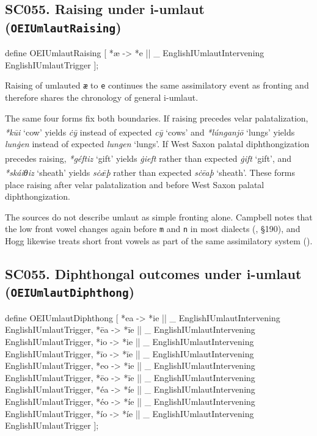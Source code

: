 \documentclass[
  british,
  a4paper,
  openany]{book}
\providecommand{\Pred}[1]{\textsuperscript{\dag}\emph{#1}}
\providecommand{\Recon}[1]{\emph{*#1}}
{\catcode`→=\active \global\def→{\ensuremath{\rightarrow}}}
\providecommand{\texorpdfstring}[2]{#1}
\providecommand{\Pred}[1]{\textsuperscript{\dag}\emph{#1}}
\providecommand{\Recon}[1]{\emph{*#1}}
{\catcode`→=\active \global\def→{\ensuremath{\rightarrow}}}
\begin{document}
\subsection{\texorpdfstring{SC055. Raising under i-umlaut
(\texttt{OEIUmlautRaising})}{SC055. Raising under i-umlaut (OEIUmlautRaising)}}\label{rule-OEIUmlautRaising}

\begin{ReaderFacingFoma}
define OEIUmlautRaising [
    {*æ} -> {*e} || _ EnglishIUmlautIntervening EnglishIUmlautTrigger
];
\end{ReaderFacingFoma}

Raising of umlauted \texttt{æ} to \texttt{e} continues the same
assimilatory event as fronting and therefore shares the chronology of
general i-umlaut.

The same four forms fix both boundaries. If raising precedes velar
palatalization, \Recon{kūi} `cow' yields \Pred{ċȳ} instead of expected
\emph{cȳ} `cows' and \Recon{lúnganjō} `lungs' yields \Pred{lunġen}
instead of expected \emph{lungen} `lungs'. If West Saxon palatal
diphthongization precedes raising, \Recon{géftiz} `gift' yields
\Pred{ġieft} rather than expected \emph{ġift} `gift', and
\Recon{skáiθiz} `sheath' yields \Pred{sċǣþ} rather than expected
\emph{sċēaþ} `sheath'. These forms place raising after velar
palatalization and before West Saxon palatal diphthongization.

The sources do not describe umlaut as simple fronting alone. Campbell
notes that the low front vowel changes again before \texttt{m} and
\texttt{n} in most dialects (, §190), and Hogg likewise treats short front vowels as part of the
same assimilatory system ().

\subsection{\texorpdfstring{SC055. Diphthongal outcomes under i-umlaut
(\texttt{OEIUmlautDiphthong})}{SC055. Diphthongal outcomes under i-umlaut (OEIUmlautDiphthong)}}\label{rule-OEIUmlautDiphthong}

\begin{ReaderFacingFoma}
define OEIUmlautDiphthong [
    {*ea} -> {*ie} || _ EnglishIUmlautIntervening EnglishIUmlautTrigger,
    {*ēa} -> {*īe} || _ EnglishIUmlautIntervening EnglishIUmlautTrigger,
    {*io} -> {*ie} || _ EnglishIUmlautIntervening EnglishIUmlautTrigger,
    {*īo} -> {*īe} || _ EnglishIUmlautIntervening EnglishIUmlautTrigger,
    {*eo} -> {*ie} || _ EnglishIUmlautIntervening EnglishIUmlautTrigger,
    {*ēo} -> {*īe} || _ EnglishIUmlautIntervening EnglishIUmlautTrigger,
    {*éa} -> {*íe} || _ EnglishIUmlautIntervening EnglishIUmlautTrigger,
    {*éo} -> {*íe} || _ EnglishIUmlautIntervening EnglishIUmlautTrigger,
    {*ío} -> {*íe} || _ EnglishIUmlautIntervening EnglishIUmlautTrigger
];
\end{ReaderFacingFoma}
\end{document}
